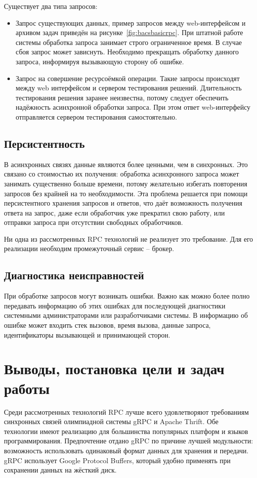 Существует два типа запросов:
\begin{itemize}
    \item Запрос существующих данных, пример запросов между web-интерфейсом и
        архивом задач приведён на рисунке~\ref{fig:bacsbasicrpc}.
        При штатной работе системы обработка запроса занимает строго
        ограниченное время. В случае сбоя запрос может зависнуть.
        Необходимо прекращать обработку данного запроса,
        информируя вызывающую сторону об ошибке.
    \item Запрос на совершение ресурсоёмкой операции. Такие запросы происходят
        между web интерфейсом и сервером тестирования решений.
        Длительность тестирования решения заранее неизвестна, потому следует
        обеспечить надёжность асинхронной обработки запроса. При этом ответ
        web-интерфейсу отправляется сервером тестирования самостоятельно.
\end{itemize}

\subsection{Персистентность}
В асинхронных связях данные являются более ценными, чем в синхронных.
Это связано со стоимостью их получения: обработка асинхронного запроса
может занимать существенно больше времени, потому желательно избегать
повторения запросов без крайней на то необходимости. Эта проблема решается
при помощи персистентного хранения запросов и ответов, что даёт возможность
получения ответа на запрос, даже если обработчик уже прекратил свою работу,
или отправки запроса при отсутствии свободных обработчиков.

Ни одна из рассмотренных RPC технологий не реализует это требование.
Для его реализации необходим промежуточный сервис -- брокер.

\subsection{Диагностика неисправностей}
При обработке запросов могут возникать ошибки. Важно как можно более полно
передавать информацию об этих ошибках для последующей диагностики системными
администраторами или разработчиками системы. В информацию об ошибке может
входить стек вызовов, время вызова, данные запроса, идентификаторы вызывающей
и принимающей сторон.

\section{Выводы, постановка цели и задач работы}
Среди рассмотренных технологий RPC лучше всего удовлетворяют требованиям
синхронных связей олимпиадной системы gRPC и Apache Thrift. Обе технологии
имеют реализацию для большинства популярных платформ и языков программирования.
Предпочтение отдано gRPC по причине лучшей модульности: возможность
использовать одинаковый формат данных для хранения и передачи. gRPC
использует Google Protocol Buffers, который удобно применять при сохранении
данных на жёсткий диск.

